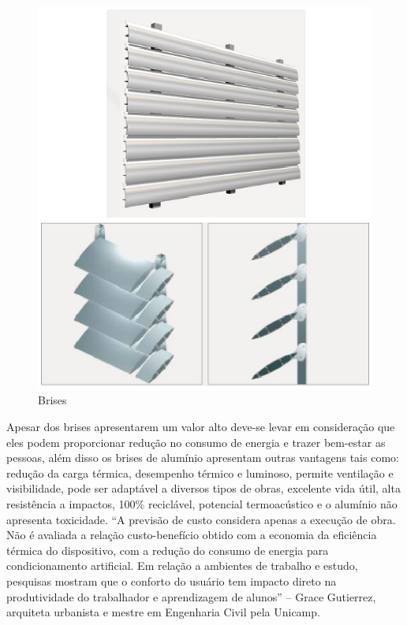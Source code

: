 \begin{figure}[!h]
  \centering
  \includegraphics[keepaspectratio=true,scale=1]{figuras/brises.eps}
  \caption{Brises}
  \label{fig:brises}
\end{figure}

Apesar dos brises apresentarem um valor alto deve-se levar em consideração que eles podem proporcionar redução no consumo de energia e trazer bem-estar as pessoas, além disso os brises de alumínio apresentam outras vantagens tais como: redução da carga térmica, desempenho térmico e luminoso, permite ventilação e visibilidade, pode ser adaptável a diversos tipos de obras, excelente vida útil, alta resistência a impactos, 100\% reciclável, potencial termoacústico e o alumínio não apresenta toxicidade.  “A previsão de custo considera apenas a execução de obra. Não é avaliada a relação custo-benefício obtido com a economia da eficiência térmica do dispositivo, com a redução do consumo de energia para condicionamento artificial. Em relação a ambientes de trabalho e estudo, pesquisas mostram que o conforto do usuário tem impacto direto na produtividade do trabalhador e aprendizagem de alunos” – Grace Gutierrez, arquiteta urbanista e mestre em Engenharia Civil pela Unicamp. 

